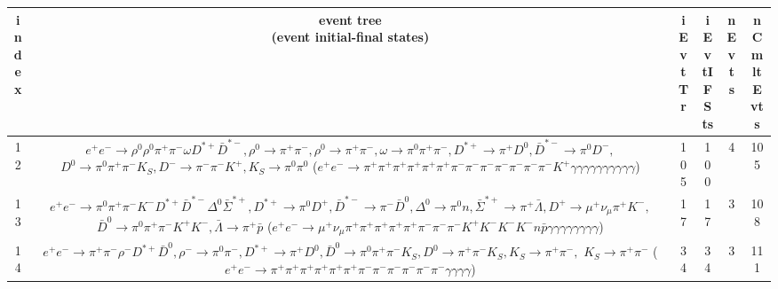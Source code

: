 \documentclass[landscape]{article}
\begin{document}
\begin{table}[htbp!]
\small
\centering
\begin{tabular}{|c|c|c|c|c|c|}
\hline
index & \thead{event tree \\ (event initial-final states)} & iEvtTr & iEvtIFSts & nEvts & nCmltEvts \\
\hline
12 & \makecell{ $ 
e^{+} e^{-} \rightarrow \rho^{0} \rho^{0} \pi^{+} \pi^{-} \omega D^{*+} \bar{D}^{*-} ,
\rho^{0} \rightarrow \pi^{+} \pi^{-} ,
\rho^{0} \rightarrow \pi^{+} \pi^{-} ,
\omega \rightarrow \pi^{0} \pi^{+} \pi^{-} ,
D^{*+} \rightarrow \pi^{+} D^{0} ,
\bar{D}^{*-} \rightarrow \pi^{0} D^{-} ,
$ \\ $
D^{0} \rightarrow \pi^{0} \pi^{+} \pi^{-} K_{S} ,
D^{-} \rightarrow \pi^{-} \pi^{-} K^{+} ,
K_{S} \rightarrow \pi^{0} \pi^{0} 
$ \\ ($
e^{+} e^{-} \rightarrow \pi^{+} \pi^{+} \pi^{+} \pi^{+} \pi^{+} \pi^{+} \pi^{-} \pi^{-} \pi^{-} \pi^{-} \pi^{-} \pi^{-} \pi^{-} K^{+} \gamma \gamma \gamma \gamma \gamma \gamma \gamma \gamma \gamma \gamma 
$) } & 105 & 100 & 4 & 105 \\
\hline
13 & \makecell{ $ 
e^{+} e^{-} \rightarrow \pi^{0} \pi^{+} \pi^{-} K^{-} D^{*+} \bar{D}^{*-} \Delta^{0} \bar{\Sigma}^{*+} ,
D^{*+} \rightarrow \pi^{0} D^{+} ,
\bar{D}^{*-} \rightarrow \pi^{-} \bar{D}^{0} ,
\Delta^{0} \rightarrow \pi^{0} n ,
\bar{\Sigma}^{*+} \rightarrow \pi^{+} \bar{\Lambda} ,
D^{+} \rightarrow \mu^{+} \nu_{\mu} \pi^{+} K^{-} ,
$ \\ $
\bar{D}^{0} \rightarrow \pi^{0} \pi^{+} \pi^{-} K^{+} K^{-} ,
\bar{\Lambda} \rightarrow \pi^{+} \bar{p} 
$ \\ ($
e^{+} e^{-} \rightarrow \mu^{+} \nu_{\mu} \pi^{+} \pi^{+} \pi^{+} \pi^{+} \pi^{+} \pi^{-} \pi^{-} \pi^{-} K^{+} K^{-} K^{-} K^{-} n \bar{p} \gamma \gamma \gamma \gamma \gamma \gamma \gamma \gamma 
$) } & 17 & 17 & 3 & 108 \\
\hline
14 & \makecell{ $ 
e^{+} e^{-} \rightarrow \pi^{+} \pi^{-} \rho^{-} D^{*+} \bar{D}^{0} ,
\rho^{-} \rightarrow \pi^{0} \pi^{-} ,
D^{*+} \rightarrow \pi^{+} D^{0} ,
\bar{D}^{0} \rightarrow \pi^{0} \pi^{+} \pi^{-} K_{S} ,
D^{0} \rightarrow \pi^{+} \pi^{-} K_{S} ,
K_{S} \rightarrow \pi^{+} \pi^{-} ,
$ \\ $
K_{S} \rightarrow \pi^{+} \pi^{-} 
$ \\ ($
e^{+} e^{-} \rightarrow \pi^{+} \pi^{+} \pi^{+} \pi^{+} \pi^{+} \pi^{+} \pi^{-} \pi^{-} \pi^{-} \pi^{-} \pi^{-} \pi^{-} \gamma \gamma \gamma \gamma 
$) } & 34 & 34 & 3 & 111 \\

\end{tabular}
\end{table}
\end{document}
